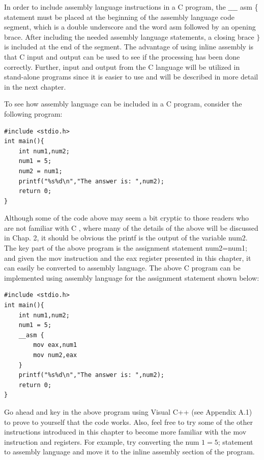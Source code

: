 \documentclass[10pt]{article}
\begin{document}
In order to include assembly language instructions in a C program, the $\_\_\_\_$ asm \{ statement must be placed at the beginning of the assembly language code segment, which is a double underscore and the word asm followed by an opening brace. After including the needed assembly language statements, a closing brace $\}$ is included at the end of the segment. The advantage of using inline assembly is that C input and output can be used to see if the processing has been done correctly. Further, input and output from the C language will be utilized in stand-alone programs since it is easier to use and will be described in more detail in the next chapter.

To see how assembly language can be included in a C program, consider the following program:

\begin{verbatim}
#include <stdio.h>
int main(){
    int num1,num2;
    num1 = 5;
    num2 = num1;
    printf("%s%d\n","The answer is: ",num2);
    return 0;
}
\end{verbatim}

Although some of the code above may seem a bit cryptic to those readers who are not familiar with C , where many of the details of the above will be discussed in Chap. 2, it should be obvious the printf is the output of the variable num2. The key part of the above program is the assignment statement num2=num1; and given the mov instruction and the eax register presented in this chapter, it can easily be converted to assembly language. The above C program can be implemented using assembly language for the assignment statement shown below:

\begin{verbatim}
#include <stdio.h>
int main(){
    int num1,num2;
    num1 = 5;
    __asm {
        mov eax,num1
        mov num2,eax
    }
    printf("%s%d\n","The answer is: ",num2);
    return 0;
}
\end{verbatim}

Go ahead and key in the above program using Visual C++ (see Appendix A.1) to prove to yourself that the code works. Also, feel free to try some of the other instructions introduced in this chapter to become more familiar with the mov instruction and registers. For example, try converting the num $1=5$; statement to assembly language and move it to the inline assembly section of the program.
\end{document}
